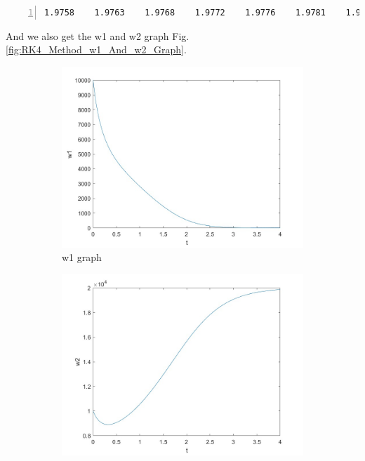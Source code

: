 \documentclass{article}
\begin{document}
\begin{enumerate}
\begin{lstlisting}[frame=single, numbers=left, style=Matlab-editor]
    1.9758    1.9763    1.9768    1.9772    1.9776    1.9781    1.9785    1.9789    1.9793    1.9797    1.9801    1.9805    1.9809    1.9813    1.9816    1.9820    1.9823    1.9827    1.9830    1.9833    1.9837    1.9840    1.9843    1.9846    1.9849    1.9852    1.9855    1.9858    1.9860    1.9863
    \end{lstlisting} And we also get the w1 and w2 graph Fig.\ref{fig:RK4_Method_w1_And_w2_Graph}. \begin{figure}[h] %
        \begin{subfigure}{.5\textwidth}
            \includegraphics[width=\textwidth]{assignment_5_4_1_fig.jpg}
            \centering
            \caption{w1 graph}
        \end{subfigure}%
        \begin{subfigure}{.5\textwidth}
            \includegraphics[width=\textwidth]{assignment_5_4_2_fig.jpg}

\end{subfigure}
\end{figure}
\end{enumerate}
\end{document}
